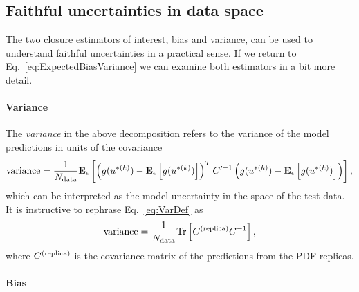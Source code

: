 \subsection{Faithful uncertainties in data space}

The two closure estimators of interest, bias and variance, can be used to
understand faithful uncertainties in a practical sense. If we return to
Eq.~\ref{eq:ExpectedBiasVariance} we can examine both estimators in a bit
more detail.

\paragraph{Variance}

The {\em variance} in the above decomposition refers to the variance of the
model predictions in units of the covariance
\begin{equation}
    \label{eq:VarDef}
    {\rm variance} = \frac{1}{N_{\rm data}}
    \mathbf{E}_{\epsilon}\left[ 
            \left( g(u^{* (k)}) - \mathbf{E}_{\epsilon}\left[ g(u^{* (k)}) \right] \right)^T
            C^{\prime -1}
            \left( g(u^{* (k)}) - \mathbf{E}_{\epsilon}\left[ g(u^{* (k)}) \right] \right)
         \right],
\end{equation}
which can be interpreted as the model uncertainty in the space of the
test data. It is instructive to rephrase Eq.~\ref{eq:VarDef} as
\begin{equation}
    \label{eq:VarDefalternative}
    {\rm variance} = \frac{1}{N_{\rm data}} {\rm Tr} \left[ C^{(\rm replica)} C^{-1}_{} \right],
\end{equation}
where $C^{(\rm replica)}$ is the covariance matrix of the predictions
from the PDF replicas.

\paragraph{Bias}

